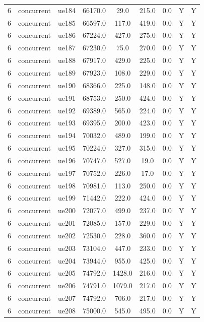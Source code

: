 \begin{table}[ht]
\begin{tabular}{|c|c|c|c|c|c|c|c|c|}
6 & concurrent & ue184 & 66170.0 & 29.0 & 215.0 & 0.0 & Y & Y \\
6 & concurrent & ue185 & 66597.0 & 117.0 & 419.0 & 0.0 & Y & Y \\
6 & concurrent & ue186 & 67224.0 & 427.0 & 275.0 & 0.0 & Y & Y \\
6 & concurrent & ue187 & 67230.0 & 75.0 & 270.0 & 0.0 & Y & Y \\
6 & concurrent & ue188 & 67917.0 & 429.0 & 225.0 & 0.0 & Y & Y \\
6 & concurrent & ue189 & 67923.0 & 108.0 & 229.0 & 0.0 & Y & Y \\
6 & concurrent & ue190 & 68366.0 & 225.0 & 148.0 & 0.0 & Y & Y \\
6 & concurrent & ue191 & 68753.0 & 250.0 & 424.0 & 0.0 & Y & Y \\
6 & concurrent & ue192 & 69389.0 & 565.0 & 224.0 & 0.0 & Y & Y \\
6 & concurrent & ue193 & 69395.0 & 200.0 & 423.0 & 0.0 & Y & Y \\
6 & concurrent & ue194 & 70032.0 & 489.0 & 199.0 & 0.0 & Y & Y \\
6 & concurrent & ue195 & 70224.0 & 327.0 & 315.0 & 0.0 & Y & Y \\
6 & concurrent & ue196 & 70747.0 & 527.0 & 19.0 & 0.0 & Y & Y \\
6 & concurrent & ue197 & 70752.0 & 226.0 & 17.0 & 0.0 & Y & Y \\
6 & concurrent & ue198 & 70981.0 & 113.0 & 250.0 & 0.0 & Y & Y \\
6 & concurrent & ue199 & 71442.0 & 222.0 & 424.0 & 0.0 & Y & Y \\
6 & concurrent & ue200 & 72077.0 & 499.0 & 237.0 & 0.0 & Y & Y \\
6 & concurrent & ue201 & 72085.0 & 157.0 & 229.0 & 0.0 & Y & Y \\
6 & concurrent & ue202 & 72530.0 & 228.0 & 360.0 & 0.0 & Y & Y \\
6 & concurrent & ue203 & 73104.0 & 447.0 & 233.0 & 0.0 & Y & Y \\
6 & concurrent & ue204 & 73944.0 & 955.0 & 425.0 & 0.0 & Y & Y \\
6 & concurrent & ue205 & 74792.0 & 1428.0 & 216.0 & 0.0 & Y & Y \\
6 & concurrent & ue206 & 74791.0 & 1079.0 & 217.0 & 0.0 & Y & Y \\
6 & concurrent & ue207 & 74792.0 & 706.0 & 217.0 & 0.0 & Y & Y \\
6 & concurrent & ue208 & 75000.0 & 545.0 & 495.0 & 0.0 & Y & Y \\

\end{tabular}
\end{table}
